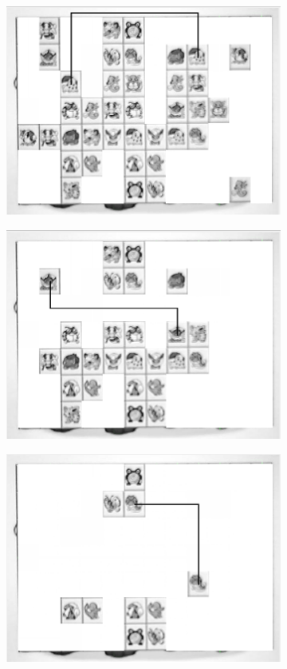 \documentclass{article}
\numberwithin{figure}{section}
\numberwithin{table}{section}
\numberwithin{listing}{section}
\numberwithin{equation}{section}
\begin{document}
\begin{enumerate}
\begin{figure}[H]
\begin{subfigure}{0.5\textwidth}
                    \end{subfigure}%
                    \begin{subfigure}{0.5\textwidth}
                        \centering
                        \includegraphics[width=0.77\linewidth]{mocklink4}
                    \end{subfigure}
                    \begin{subfigure}{0.5\textwidth}
                        \centering
                        \includegraphics[width=0.77\linewidth]{mocklink5}
                    \end{subfigure}%
                    \begin{subfigure}{0.5\textwidth}
                        \centering
                        \includegraphics[width=0.77\linewidth]{mocklink6}

\end{subfigure}
\end{figure}
\end{enumerate}
\end{document}
